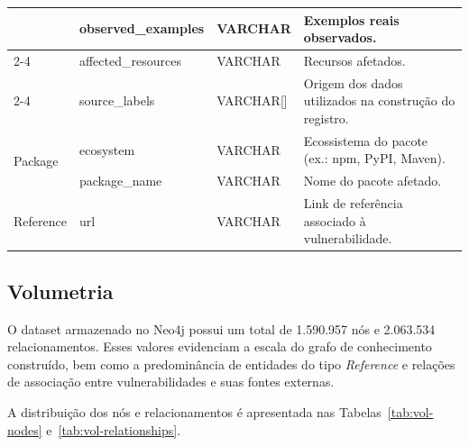 \begin{table}[H]
{\begin{tabular}{|p{2.2cm}|p{3.3cm}|p{1.9cm}|p{8.4cm}|}
                              & observed\_examples     & VARCHAR       & Exemplos reais observados.                                                                            \\ \cline{2-4}
                              & affected\_resources    & VARCHAR       & Recursos afetados.                                                                                    \\ \cline{2-4}
                              & source\_labels         & VARCHAR[]     & Origem dos dados utilizados na construção do registro.                                                \\ \hline

            \multirow{2}{*}{Package}
                              & ecosystem              & VARCHAR       & Ecossistema do pacote (ex.: npm, PyPI, Maven).                                                        \\ \cline{2-4}
                              & package\_name          & VARCHAR       & Nome do pacote afetado.                                                                               \\ \hline

            Reference
                              & url                    & VARCHAR       & Link de referência associado à vulnerabilidade.                                                       \\ \hline
        \end{tabular}
    }
\end{table}

\subsection{Volumetria}

O dataset armazenado no Neo4j possui um total de 1.590.957 nós e 2.063.534 relacionamentos. Esses valores evidenciam a escala do grafo de conhecimento construído, bem como a predominância de entidades do tipo \textit{Reference} e relações de associação entre vulnerabilidades e suas fontes externas.

A distribuição dos nós e relacionamentos é apresentada nas Tabelas~\ref{tab:vol-nodes} e~\ref{tab:vol-relationships}.


